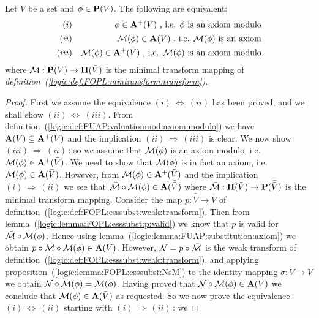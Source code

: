 \begin{prop}\label{logic:prop:FUAP:valsubaxmodulo:min:transform}
Let $V$ be a set and $\phi\in\mbox{${\bf P}(V)$}$. The following are equivalent:
    \begin{eqnarray*}
    (i)&&\phi\in\mbox{${\bf A}^{+}(V)$}\mbox{\ , i.e. $\phi$ is an axiom modulo}\\
    (ii)&&{\cal M}(\phi)\in{\bf A}(\bar{V})\mbox{\ , i.e. ${\cal M}(\phi)$ is an axiom}\\
    (iii)&&{\cal M}(\phi)\in{\bf A}^{+}(\bar{V})\mbox{\ , i.e. ${\cal M}(\phi)$ is an axiom modulo}
    \end{eqnarray*}
where ${\cal M}:\mbox{${\bf P}(V)$}\to\mbox{${\bf\Pi}(\bar{V})$}$ is the minimal transform mapping of {\em
definition~(\ref{logic:def:FOPL:mintransform:transform})}.
\end{prop}
\begin{proof}
First we assume the equivalence $(i)\ \Leftrightarrow\ (ii)$ has
been proved, and we shall show $(ii)\ \Leftrightarrow\ (iii)$. From
definition~(\ref{logic:def:FUAP:valuationmod:axiom:modulo}) we have
${\bf A}(\bar{V})\subseteq{\bf A}^{+}(\bar{V})$ and the implication
$(ii)\ \Rightarrow\ (iii)$ is clear. We now show $(iii)\
\Rightarrow\ (ii)$\,: so we assume that ${\cal M}(\phi)$ is an axiom
modulo, i.e. ${\cal M}(\phi)\in{\bf A}^{+}(\bar{V})$. We need to
show that ${\cal M}(\phi)$ is in fact an axiom, i.e. ${\cal
M}(\phi)\in{\bf A}(\bar{V})$. However, from ${\cal M}(\phi)\in{\bf
A}^{+}(\bar{V})$ and the implication $(i)\ \Rightarrow\ (ii)$ we see
that ${\bar{\cal M}}\circ{\cal M}(\phi)\in{\bf A}(\bar{\bar{V}})$
where ${\bar{\cal M}}:\mbox{${\bf\Pi}(\bar{V})$}\to{\bf P}(\bar{\bar{V}})$ is the minimal
transform mapping. Consider the map $p:\bar{\bar{V}}\to\bar{V}$ of
definition~(\ref{logic:def:FOPL:esssubst:weak:transform}). Then from
lemma~(\ref{logic:lemma:FOPL:esssubst:p:valid}) we know that $p$ is
valid for ${\bar{\cal M}}\circ{\cal M}(\phi)$. Hence using
lemma~(\ref{logic:lemma:FUAP:substitution:axiom}) we obtain
$p\circ{\bar{\cal M}}\circ{\cal M}(\phi)\in{\bf A}(\bar{V})$.
However, ${\cal N}=p\circ{\bar{\cal M}}$ is the weak transform of
definition~(\ref{logic:def:FOPL:esssubst:weak:transform}), and
applying proposition~(\ref{logic:lemma:FOPL:esssubst:NsM}) to the
identity mapping $\sigma:V\to V$ we obtain ${\cal N}\circ{\cal
M}(\phi)={\cal M}(\phi)$. Having proved that ${\cal N}\circ{\cal
M}(\phi)\in{\bf A}(\bar{V})$ we conclude that ${\cal M}(\phi)\in{\bf
A}(\bar{V})$ as requested. So we now prove the equivalence $(i)\
\Leftrightarrow\ (ii)$ starting with $(i)\ \Rightarrow\ (ii)$\,: we

\end{proof}
